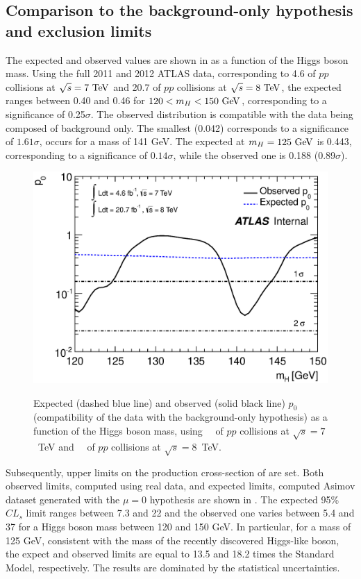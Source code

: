 \subsection{Comparison to the background-only hypothesis and exclusion limits} 
The expected and observed \pzero values are shown in 
as a function of the Higgs boson mass. Using the full 2011 and 2012 ATLAS data,
corresponding to 4.6 \ifb of $pp$ collisions at $\rts = 7 \TeV$ and 20.7 \ifb
of $pp$ collisions at $\rts=8\TeV$, the expected \pzero ranges between 0.40
and 0.46 for $120 < m_H < 150 \GeV$, corresponding to a significance of 0.25$\sigma$.
The observed \pzero distribution is compatible with the data being composed of
background only. The smallest \pzero (0.042) corresponds to a significance of
$1.61\sigma$, occurs for a mass of 141 GeV. The expected \pzero at $m_H = 125 \GeV$
is 0.443, corresponding to a significance of $0.14\sigma$, while the observed one
is 0.188 (0.89$\sigma$).

\begin{figure}[!htbp]
\centering
    {\includegraphics[totalheight=9cm,angle=0]{figures/plot_p0}}
    \caption{Expected (dashed blue line) and observed 
      (solid black line) $p_0$ (compatibility of
      the data with the background-only hypothesis) as a function
      of the Higgs boson mass, using \lumiseventev~\ifb\ of $pp$
      collisions at $\sqrt{s}=7$~TeV and \lumieighttev~\ifb\ of $pp$
      collisions at $\sqrt{s}=8$~TeV.}
    \label{fig:ExpectedP0_1}
\end{figure}

Subsequently, upper limits on the production cross-section of \HToZg are set.
Both observed limits, computed using real data, and expected limits, computed
Asimov dataset generated with the $\mu=0$ hypothesis are shown in 
. The expected 95\% $CL_s$ limit ranges between
7.3 and 22 and the observed one varies between 5.4 and 37 for a Higgs boson
mass between 120 and 150 GeV. In particular, for a mass of 125 GeV, consistent
with the mass of the recently discovered Higgs-like boson, the expect and observed
limits are equal to 13.5 and 18.2 times the Standard Model, respectively. The
results are dominated by the statistical uncertainties.

